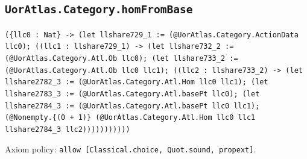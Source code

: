 \documentclass[11pt]{article}
\begin{document}
\subsection*{\texttt{UorAtlas.Category.homFromBase}}
\noindent\texttt{(\{llc0 : Nat\} -> (let llshare729\_1 := (@UorAtlas.Category.ActionData llc0); ((llc1 : llshare729\_1) -> (let llshare732\_2 := (@UorAtlas.Category.Atl.Ob llc0); (let llshare733\_2 := (@UorAtlas.Category.Atl.Ob llc0 llc1); ((llc2 : llshare733\_2) -> (let llshare2782\_3 := (@UorAtlas.Category.Atl.Hom llc0 llc1); (let llshare2783\_3 := (@UorAtlas.Category.Atl.basePt llc0); (let llshare2784\_3 := (@UorAtlas.Category.Atl.basePt llc0 llc1); (@Nonempty.\{(0 + 1)\} (@UorAtlas.Category.Atl.Hom llc0 llc1 llshare2784\_3 llc2)))))))))))}\par
\noindent Axiom policy: \texttt{allow [Classical.choice, Quot.sound, propext]}.\par
\end{document}
